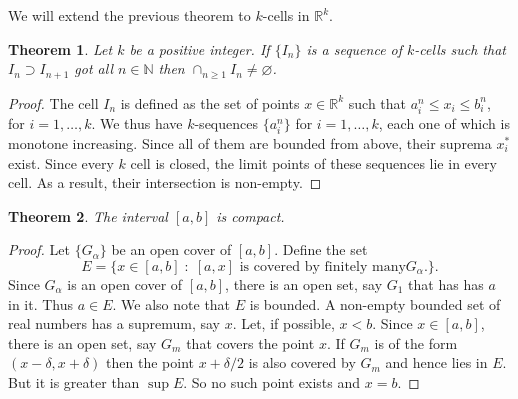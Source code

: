 \documentclass{article}
\theoremstyle{plain}
\newtheorem{thm}{Theorem}
\numberwithin{thm}{section}
\theoremstyle{plain}
\numberwithin{prop}{section}
\theoremstyle{definition}
\numberwithin{defn}{section}
\theoremstyle{remark}
\numberwithin{equation}{section}
\begin{document}
We will extend the previous theorem to $k$-cells in $\mathbb{R}^k$.
\begin{thm}\label{s2t7}
Let $k$ be a positive integer. If $\{I_n\}$ is a sequence of $k$-cells such
that $I_n \supset I_{n+1}$ got all $n \in \mathbb{N}$ then $\cap_{n \ge 1}I_n
\ne \varnothing$.
\end{thm}
\begin{proof}
The cell $I_n$ is defined as the set of points $x \in \mathbb{R}^k$ such that
$a^n_i \le x_i \le b^n_i$, for $i = 1, \ldots, k$. We thus have $k$-sequences
$\{a^n_i\}$ for $i = 1, \ldots, k$, each one of which is monotone increasing.
Since all of them are bounded from above, their suprema $x^\ast_i$ exist. Since
every $k$ cell is closed, the limit points of these sequences lie in every cell.
As a result, their intersection is non-empty.
\end{proof}

\begin{thm}\label{s2t8}
The interval $[a, b]$ is compact.
\end{thm}
\begin{proof}
Let $\{G_\alpha\}$ be an open cover of $[a, b]$. Define the set
\[
E = \{x \in [a, b]\;:\; [a, x]\text{ is covered by finitely many} G_\alpha.\}.
\]
Since $G_\alpha$ is an open cover of $[a, b]$, there is an open set, say $G_1$
that has has $a$ in it. Thus $a \in E$. We also note that $E$ is bounded. A
non-empty bounded set of real numbers has a supremum, say $x$. Let, if possible,
$x < b$. Since $x \in [a, b]$, there is an open set, say $G_m$ that covers the
point $x$. If $G_m$ is of the form $(x - \delta, x + \delta)$ then the point
$x + \delta/2$ is also covered by $G_m$ and hence lies in $E$. But it is greater
than $\sup E$. So no such point exists and $x = b$.
\end{proof}
\end{document}
